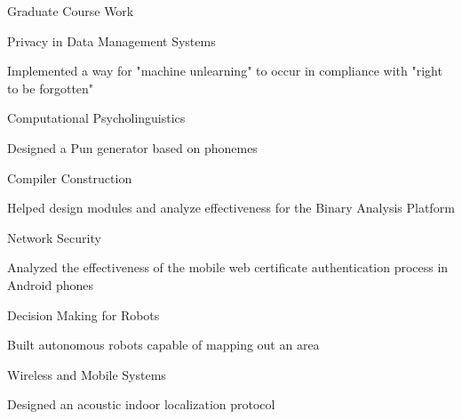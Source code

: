 \documentclass{resume} %
\begin{document}
\vspace{1cm}
\begin{rSection}{Graduate Course Work}

\begin{rSubsection}{Privacy in Data Management Systems}{}{}{}
\item Implemented a way for "machine unlearning" to occur in compliance with "right to be forgotten"
\end{rSubsection}
\begin{rSubsection}{Computational Psycholinguistics}{}{}{}
\item Designed a Pun generator based on phonemes
\end{rSubsection}
\begin{rSubsection}{Compiler Construction}{}{}{}
\item Helped design modules and analyze effectiveness for the Binary Analysis Platform
\end{rSubsection}

\begin{rSubsection}{Network Security}{}{}{}
\item Analyzed the effectiveness of the mobile web certificate authentication process in Android phones
\end{rSubsection}

\begin{rSubsection}{Decision Making for Robots}{}{}{}
\item Built autonomous robots capable of mapping out an area
\end{rSubsection}

\begin{rSubsection}{Wireless and Mobile Systems}{}{}{}
\item Designed an acoustic indoor localization protocol 
\end{rSubsection}

\end{rSection}

\end{document}

